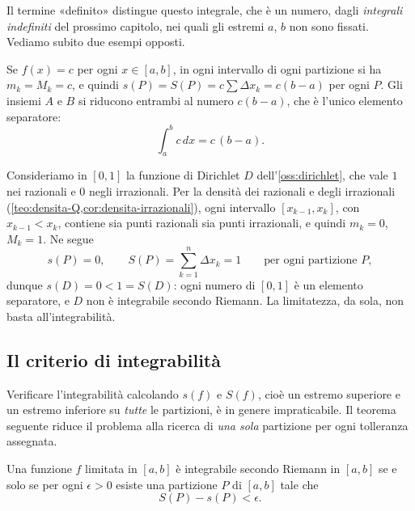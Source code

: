 Il termine «definito» distingue questo integrale, che è un numero, dagli
\emph{integrali indefiniti} del prossimo capitolo, nei quali gli estremi $a$, $b$ non
sono fissati. Vediamo subito due esempi opposti.

\begin{esempio}\label{es:integrale-costante}
Se $f(x)=c$ per ogni $x\in[a,b]$, in ogni intervallo di ogni partizione si ha
$m_{k}=M_{k}=c$, e quindi $s(P)=S(P)=c\sum\Delta x_{k}=c(b-a)$ per ogni $P$. Gli insiemi
$A$ e $B$ si riducono entrambi al numero $c(b-a)$, che è l'unico elemento separatore:
\begin{equation}\label{eq:integrale-costante}
  \int_{a}^{b}c\,dx=c\,(b-a) .
\end{equation}
\end{esempio}

\begin{esempio}\label{es:dirichlet-non-integrabile}
Consideriamo in $[0,1]$ la funzione di Dirichlet $D$ dell'\cref{oss:dirichlet}, che
vale $1$ nei razionali e $0$ negli irrazionali. Per la densità dei razionali e degli
irrazionali (\cref{teo:densita-Q,cor:densita-irrazionali}), ogni intervallo
$[x_{k-1},x_{k}]$, con $x_{k-1}<x_{k}$, contiene sia punti razionali sia punti
irrazionali, e quindi $m_{k}=0$, $M_{k}=1$. Ne segue
\[
  s(P)=0, \qquad S(P)=\sum_{k=1}^{n}\Delta x_{k}=1 \qquad\text{per ogni partizione } P,
\]
dunque $s(D)=0<1=S(D)$: ogni numero di $[0,1]$ è un elemento separatore, e $D$ non è
integrabile secondo Riemann. La limitatezza, da sola, non basta all'integrabilità.
\end{esempio}

\subsection{Il criterio di integrabilità}

Verificare l'integrabilità calcolando $s(f)$ e $S(f)$, cioè un estremo superiore e un
estremo inferiore su \emph{tutte} le partizioni, è in genere impraticabile. Il teorema
seguente riduce il problema alla ricerca di \emph{una sola} partizione per ogni
tolleranza assegnata.

\begin{teorema}\label{teo:criterio-integrabilita}
Una funzione $f$ limitata in $[a,b]$ è integrabile secondo Riemann in $[a,b]$ se e solo
se per ogni $\epsilon>0$ esiste una partizione $P$ di $[a,b]$ tale che
\begin{equation}\label{eq:criterio-integrabilita}
  S(P)-s(P)<\epsilon .
\end{equation}
\end{teorema}

